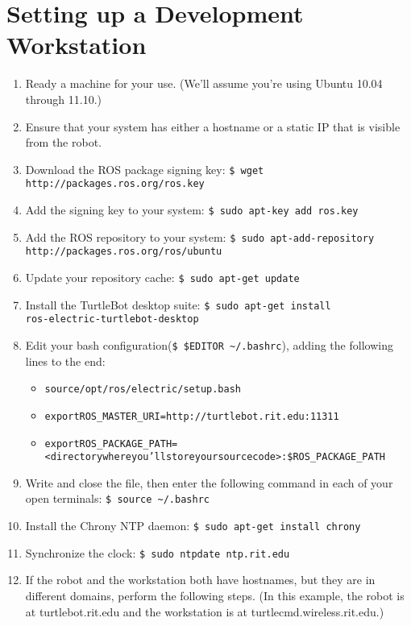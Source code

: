 \documentclass[12pt]{report}
\begin{document}
\section{Setting up a Development Workstation}
\begin{enumerate}
\item{Ready a machine for your use.  (We'll assume you're using Ubuntu 10.04 through 11.10.)}
\item{Ensure that your system has either a hostname or a static IP that is visible from the robot.}
\item{Download the ROS package signing key: \texttt{\$\ wget \\ http://packages.ros.org/ros.key}}
\item{Add the signing key to your system: \texttt{\$\ sudo apt-key add ros.key}}
\item{Add the ROS repository to your system: \texttt{\$\ sudo apt-add-repository http://packages.ros.org/ros/ubuntu}}
\item{Update your repository cache: \texttt{\$\ sudo apt-get update}}
\item{Install the TurtleBot desktop suite: \texttt{\$\ sudo apt-get install \\ ros-electric-turtlebot-desktop}}
\item{Edit your bash configuration(\texttt{\$\ \$EDITOR \~{}/.bashrc}), adding the following lines to the end:}
\begin{alltt}\begin{itemize}
\item{source /opt/ros/electric/setup.bash}
\item{export ROS\_MASTER\_URI=http://turtlebot.rit.edu:11311}
\item{export ROS\_PACKAGE\_PATH= \\ <directory where you'll store your source code>:\$ROS\_PACKAGE\_PATH}
\end{itemize}\end{alltt}
\item{Write and close the file, then enter the following command in each of your open terminals: \texttt{\$\ source \~{}/.bashrc}}
\item{Install the Chrony NTP daemon: \texttt{\$\ sudo apt-get install chrony}}
\item{Synchronize the clock: \texttt{\$\ sudo ntpdate ntp.rit.edu}}
\item{If the robot and the workstation both have hostnames, but they are in different domains, perform the following steps.  (In this example, the robot is at turtlebot.rit.edu and the workstation is at turtlecmd.wireless.rit.edu.)}

\end{enumerate}
\end{document}
